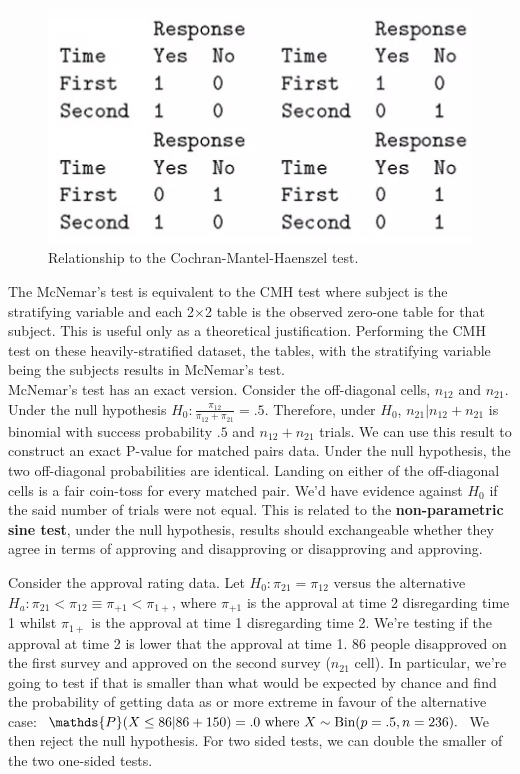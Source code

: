 \documentclass{homework}
\begin{document}
\begin{figure}
    \centering
    \includegraphics{figs/data points_week4_part7.png}
    \caption[scale=.5]{Relationship to the Cochran-Mantel-Haenszel test.}
    \label{fig:matched-2x2-cmh}
\end{figure}

The McNemar's test is equivalent to the CMH test where subject is the stratifying variable and each 2$\times$2 table is the observed zero-one table for that subject. This is useful only as a theoretical justification. Performing the CMH test on these heavily-stratified dataset, the tables, with the stratifying variable being the subjects results in McNemar's test. \\

McNemar's test has an exact version. Consider the off-diagonal cells, $n_{12}$ and $n_{21}$. Under the null hypothesis $H_0 : \frac{\pi_{12}}{\pi_{12}+\pi_{21}} = .5$. Therefore, under $H_0$, $n_{21} |n_{12}+n_{21}$ is binomial with success probability $.5$ and $n_{12}+n_{21}$ trials. We can use this result to construct an exact P-value for matched pairs data. Under the null hypothesis, the two off-diagonal probabilities are identical. Landing on either of the off-diagonal cells is a fair coin-toss for every matched pair. We'd have evidence against $H_0$ if the said number of trials were not equal. This is related to the \textbf{non-parametric sine test}, under the null hypothesis, results should exchangeable whether they agree in terms of approving and disapproving or disapproving and approving. 

Consider the approval rating data. Let $H_0 : \pi_{21}=\pi_{12}$ versus the alternative $H_a: \pi_{21} < \pi_{12} \equiv \pi_{+1}<\pi_{1+}$, where $\pi_{+1}$ is the approval at time 2 disregarding time 1 whilst $\pi_{1+}$ is the approval at time 1 disregarding time 2. We're testing if the approval at time 2 is lower that the approval at time 1. 86 people disapproved on the first survey and approved on the second survey ($n_{21}$ cell). In particular, we're going to test if that is smaller than what would be expected by chance and find the probability of getting data as or more extreme in favour of the alternative case: $\mathds{P}(X \leq 86 |86 + 150) = .0 \textnormal{ where } X\sim \textnormal{Bin}(p=.5, n=236).$ We then reject the null hypothesis. For two sided tests, we can double the smaller of the two one-sided tests. \\
\end{document}
